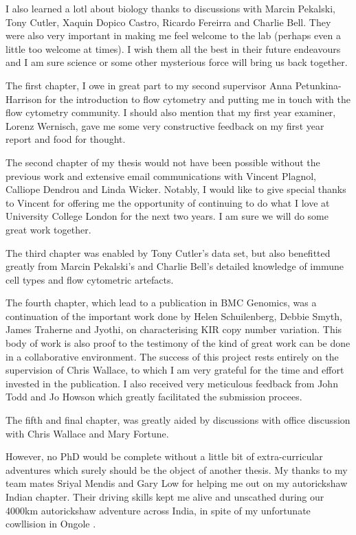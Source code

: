 \begin{acknowledgements}
 I also learned a lotl about biology thanks to discussions with Marcin Pekalski, Tony Cutler, Xaquin Dopico Castro,
 Ricardo Fereirra and Charlie Bell.
 They were also very important in making me feel welcome to the lab (perhaps even a little too welcome at times).
 I wish them all the best in their future endeavours and I am sure science or some other mysterious force will bring us back together.

 The first chapter, I owe in great part to my second supervisor Anna Petunkina-Harrison for the introduction to flow cytometry and 
 putting me in touch with the flow cytometry community.
 I should also mention that my first year examiner, Lorenz Wernisch, gave me some very constructive feedback on my first year
 report and food for thought.

 The second chapter of my thesis would not have been possible without the previous work and extensive email communications
 with Vincent Plagnol, Calliope Dendrou and Linda Wicker.
 Notably, I would like to give special thanks to Vincent for offering me the opportunity of continuing to do what I love
 at University College London for the next two years.
 I am sure we will do some great work together.

 The third chapter was enabled by Tony Cutler's data set, but also benefitted greatly from Marcin Pekalski's and Charlie Bell's
 detailed knowledge of immune cell types and flow cytometric artefacts.

 The fourth chapter, which lead to a publication in BMC Genomics, was a continuation of the important work done by
 Helen Schuilenberg, Debbie Smyth, James Traherne and Jyothi, on characterising KIR copy number variation.
 This body of work is also proof to the testimony of the kind of great work can be done in a collaborative environment.
 The success of this project rests entirely on the supervision of Chris Wallace, to which I am very grateful for the time and effort
 invested in the publication.  I also received very meticulous feedback from John Todd and Jo Howson which greatly facilitated
 the submission procees.

The fifth and final chapter, was greatly aided by discussions with office discussion with Chris Wallace and Mary Fortune.


 However, no PhD would be complete without a little bit of extra-curricular adventures which surely should
 be the object of another thesis.
 My thanks to my team mates Sriyal Mendis and Gary Low for helping me out on my autorickshaw Indian chapter.
 Their driving skills kept me alive and unscathed during our 4000km autorickshaw adventure across India,
 in spite of my unfortunate cowllision in Ongole .


\end{acknowledgements}
